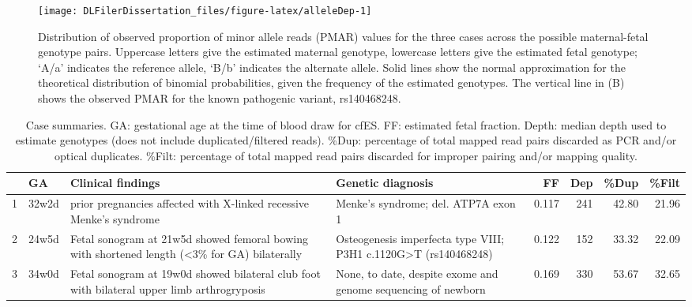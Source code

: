 \documentclass[11pt,letterpaper]{book}
\begin{document}
\begin{figure}

{\centering \texttt{[image: DLFilerDissertation\_files/figure-latex/alleleDep-1]} 

}

\caption[PMAR distribution for cell-free exome sequencing cases.]{Distribution of observed proportion of minor allele reads (PMAR) values for the three cases across the possible maternal-fetal genotype pairs. Uppercase letters give the estimated maternal genotype, lowercase letters give the estimated fetal genotype; `A/a' indicates the reference allele, `B/b' indicates the alternate allele. Solid lines show the normal approximation for the theoretical distribution of binomial probabilities, given the frequency of the estimated genotypes. The vertical line in (B) shows the observed PMAR for the known pathogenic variant, rs140468248.}\label{fig:alleleDep}
\end{figure}





















\begin{table}

\caption[Cell-free exome sequencing case summaries]{\label{tab:caseSmry}Case summaries. GA: gestational age at the time of blood draw for cfES. FF: estimated fetal fraction. Depth: median depth used to estimate genotypes (does not include duplicated/filtered reads). \%Dup: percentage of total mapped read pairs discarded as PCR and/or optical duplicates. \%Filt: percentage of total mapped read pairs discarded for improper pairing and/or mapping quality.}
\centering
\begin{tabular}[t]{ll>{\raggedright\arraybackslash}p{10em}>{\raggedright\arraybackslash}p{10em}rrrr}
\toprule
  & GA & Clinical findings & Genetic diagnosis & FF & Dep & \%Dup & \%Filt\\
\midrule
1 & 32w2d & 5 prior pregnancies affected with X-linked recessive Menke's syndrome & Menke's syndrome; del. ATP7A exon 1 & 0.117 & 241 & 42.80 & 21.96\\
2 & 24w5d & Fetal sonogram at 21w5d showed femoral bowing with shortened length (\textless3\% for GA) bilaterally & Osteogenesis imperfecta type VIII; P3H1 c.1120G\textgreater T (rs140468248) & 0.122 & 152 & 33.32 & 22.09\\
3 & 34w0d & Fetal sonogram at 19w0d showed bilateral club foot with bilateral upper limb arthrogryposis & None, to date, despite exome and genome sequencing of newborn & 0.169 & 330 & 53.67 & 32.65\\
\bottomrule
\end{tabular}
\end{table}
\end{document}
